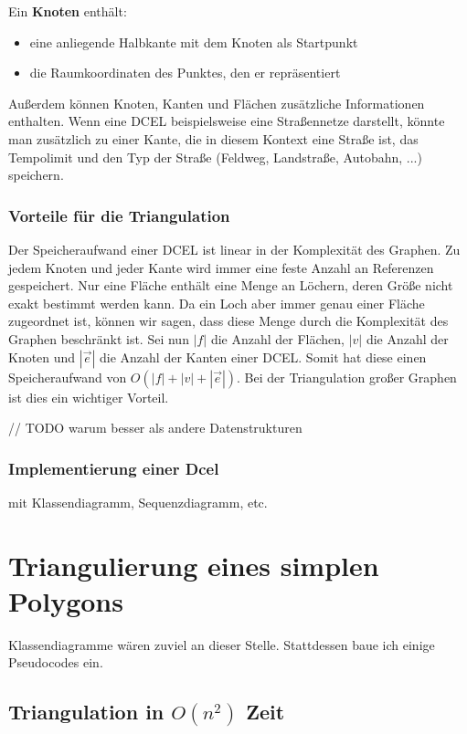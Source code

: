 \documentclass[a4paper]{article}
\begin{document}
Ein \textbf{Knoten} enthält:
\begin{itemize}
\item[] eine anliegende Halbkante mit dem Knoten als Startpunkt
\item[] die Raumkoordinaten des Punktes, den er repräsentiert
\end{itemize}

Außerdem können Knoten, Kanten und Flächen zusätzliche Informationen enthalten. Wenn eine DCEL beispielsweise eine Straßennetze darstellt, könnte man zusätzlich zu einer Kante, die in diesem Kontext eine Straße ist, das Tempolimit und den Typ der Straße (Feldweg, Landstraße, Autobahn, ...) speichern.


\subsubsection{Vorteile für die Triangulation}

Der Speicheraufwand einer DCEL ist linear in der Komplexität des Graphen. Zu jedem Knoten und jeder Kante wird immer eine feste Anzahl an Referenzen gespeichert. Nur eine Fläche enthält eine Menge an Löchern, deren Größe nicht exakt bestimmt werden kann. Da ein Loch aber immer genau einer Fläche zugeordnet ist, können wir sagen, dass diese Menge durch die Komplexität des Graphen beschränkt ist. Sei nun $|f|$ die Anzahl der Flächen, $|v|$ die Anzahl der Knoten und $|\vec{e}|$ die Anzahl der Kanten einer DCEL. Somit hat diese einen Speicheraufwand von $O(|f|+|v|+|\vec{e}|)$. Bei der Triangulation großer Graphen ist dies ein wichtiger Vorteil.

// TODO warum besser als andere Datenstrukturen

\subsubsection{Implementierung einer Dcel}
mit Klassendiagramm, Sequenzdiagramm, etc.



\section{Triangulierung eines simplen Polygons}
Klassendiagramme wären zuviel an dieser Stelle. Stattdessen baue ich einige Pseudocodes ein.

\subsection{Triangulation in $O(n^2)$ Zeit}
\end{document}
